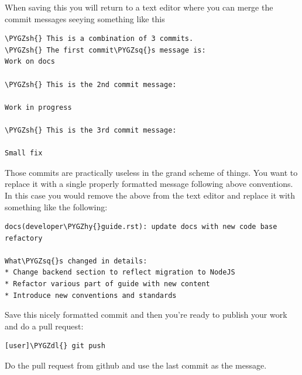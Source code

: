\documentclass[letterpaper,10pt,english]{sphinxmanual}
\def\PYGZsh{\char`\#}
\def\PYGZdl{\char`\$}
\def\PYGZhy{\char`\-}
\def\PYGZsq{\char`\'}
\renewcommand\PYGZsq{\textquotesingle}
\begin{document}
When saving this you will return to a text editor where you can merge
the commit messages seeying something like this

\begin{Verbatim}[commandchars=\\\{\}]
\PYGZsh{} This is a combination of 3 commits.
\PYGZsh{} The first commit\PYGZsq{}s message is:
Work on docs

\PYGZsh{} This is the 2nd commit message:

Work in progress

\PYGZsh{} This is the 3rd commit message:

Small fix
\end{Verbatim}

Those commits are practically useless in the grand scheme of
things. You want to replace it with a single properly formatted
message following above conventions. In this case you would remove the
above from the text editor and replace it with something like the
following:

\begin{Verbatim}[commandchars=\\\{\}]
docs(developer\PYGZhy{}guide.rst): update docs with new code base refactory

What\PYGZsq{}s changed in details:
* Change backend section to reflect migration to NodeJS
* Refactor various part of guide with new content
* Introduce new conventions and standards
\end{Verbatim}

Save this nicely formatted commit and then you're ready to publish
your work and do a pull request:

\begin{Verbatim}[commandchars=\\\{\}]
[user]\PYGZdl{} git push
\end{Verbatim}

Do the pull request from github and use the last commit as the message.
\end{document}
